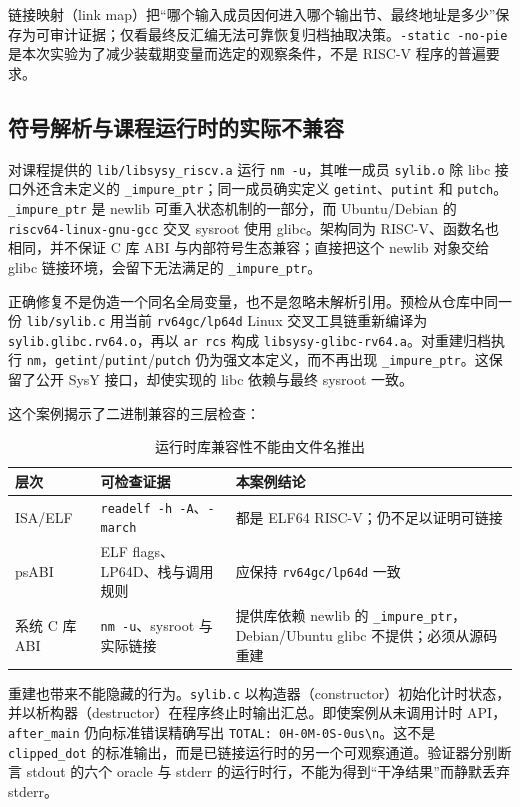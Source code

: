 链接映射（link map）把“哪个输入成员因何进入哪个输出节、最终地址是多少”保存为可审计证据；仅看最终反汇编无法可靠恢复归档抽取决策。\texttt{-static -no-pie} 是本次实验为了减少装载期变量而选定的观察条件，不是 RISC-V 程序的普遍要求。

\subsection{符号解析与课程运行时的实际不兼容}

\observed 对课程提供的 \texttt{lib/libsysy\_riscv.a} 运行 \texttt{nm -u}，其唯一成员 \texttt{sylib.o} 除 libc 接口外还含未定义的 \texttt{\_impure\_ptr}；同一成员确实定义 \texttt{getint}、\texttt{putint} 和 \texttt{putch}。\texttt{\_impure\_ptr} 是 newlib 可重入状态机制的一部分，而 Ubuntu/Debian 的 \texttt{riscv64-linux-gnu-gcc} 交叉 sysroot 使用 glibc。架构同为 RISC-V、函数名也相同，并不保证 C 库 ABI 与内部符号生态兼容；直接把这个 newlib 对象交给 glibc 链接环境，会留下无法满足的 \texttt{\_impure\_ptr}。

正确修复不是伪造一个同名全局变量，也不是忽略未解析引用。预检从仓库中同一份 \texttt{lib/sylib.c} 用当前 \texttt{rv64gc/lp64d} Linux 交叉工具链重新编译为 \texttt{sylib.glibc.rv64.o}，再以 \texttt{ar rcs} 构成 \texttt{libsysy-glibc-rv64.a}。\observed 对重建归档执行 \texttt{nm}，\texttt{getint}/\texttt{putint}/\texttt{putch} 仍为强文本定义，而不再出现 \texttt{\_impure\_ptr}。这保留了公开 SysY 接口，却使实现的 libc 依赖与最终 sysroot 一致。

这个案例揭示了二进制兼容的三层检查：

\begin{table}[t]
\caption{运行时库兼容性不能由文件名推出}
\label{tab:runtime-compat}
\centering
\small
\begin{tabular}{p{.20\linewidth}p{.33\linewidth}p{.37\linewidth}}
\toprule
层次 & 可检查证据 & 本案例结论\\
\midrule
ISA/ELF & \texttt{readelf -h -A}、\texttt{-march} & 都是 ELF64 RISC-V；仍不足以证明可链接\\
psABI & ELF flags、LP64D、栈与调用规则 & 应保持 \texttt{rv64gc/lp64d} 一致\\
系统 C 库 ABI & \texttt{nm -u}、sysroot 与实际链接 & 提供库依赖 newlib 的 \texttt{\_impure\_ptr}，Debian/Ubuntu glibc 不提供；必须从源码重建\\
\bottomrule
\end{tabular}
\end{table}

重建也带来不能隐藏的行为。\texttt{sylib.c} 以构造器（constructor）初始化计时状态，并以析构器（destructor）在程序终止时输出汇总。即使案例从未调用计时 API，\texttt{after\_main} 仍向标准错误精确写出 \texttt{TOTAL: 0H-0M-0S-0us\textbackslash n}。这不是 \texttt{clipped\_dot} 的标准输出，而是已链接运行时的另一个可观察通道。验证器分别断言 stdout 的六个 oracle 与 stderr 的运行时行，不能为得到“干净结果”而静默丢弃 stderr。

